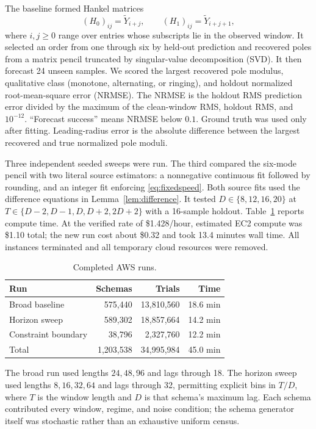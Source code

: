 \documentclass[10pt,twocolumn]{article}
\theoremstyle{cleanprop}
\begin{document}
The baseline formed Hankel matrices
\[
(H_0)_{ij}=\widetilde Y_{i+j},\qquad
(H_1)_{ij}=\widetilde Y_{i+j+1},
\]
where $i,j\ge0$ range over entries whose subscripts lie in the observed
window. It selected an order from one through six by held-out prediction and
recovered poles from a matrix pencil truncated by singular-value decomposition
(SVD). It then forecast 24 unseen samples. We scored the largest recovered
pole modulus, qualitative class (monotone, alternating, or ringing), and
holdout normalized root-mean-square error (NRMSE). The NRMSE is the holdout
RMS prediction error divided by the maximum of the clean-window RMS, holdout
RMS, and $10^{-12}$. ``Forecast success'' means NRMSE below $0.1$. Ground
truth was used only after fitting. Leading-radius error is the absolute
difference between the largest recovered and true normalized pole moduli.

Three independent seeded sweeps were run. The third compared the six-mode
pencil with two literal source estimators: a nonnegative continuous fit followed
by rounding, and an integer fit enforcing \eqref{eq:fixedspeed}. Both source
fits used the difference equations in Lemma~\ref{lem:difference}. It tested
$D\in\{8,12,16,20\}$ at $T\in\{D-2,D-1,D,D+2,2D+2\}$ with a 16-sample
holdout. Table~\ref{tab:runs} reports compute time. At the verified rate of
\$1.428/hour, estimated EC2 compute was \$1.10 total; the new run cost about
\$0.32 and took 13.4 minutes wall time. All instances terminated and all
temporary cloud resources were removed.

\begin{table}[t]
\centering
\caption{Completed AWS runs.}
\label{tab:runs}
\small
\begin{tabular}{lrrr}
\toprule
Run & Schemas & Trials & Time \\
\midrule
Broad baseline & 575,440 & 13,810,560 & 18.6 min \\
Horizon sweep & 589,302 & 18,857,664 & 14.2 min \\
Constraint boundary & 38,796 & 2,327,760 & 12.2 min \\
\midrule
Total & 1,203,538 & 34,995,984 & 45.0 min \\
\bottomrule
\end{tabular}
\end{table}

The broad run used lengths $24,48,96$ and lags through 18. The horizon sweep
used lengths $8,16,32,64$ and lags through 32, permitting explicit bins in
$T/D$, where $T$ is the window length and $D$ is that schema's maximum lag.
Each schema contributed every window, regime, and noise condition; the
schema generator itself was stochastic rather than an exhaustive uniform
census.
\end{document}

